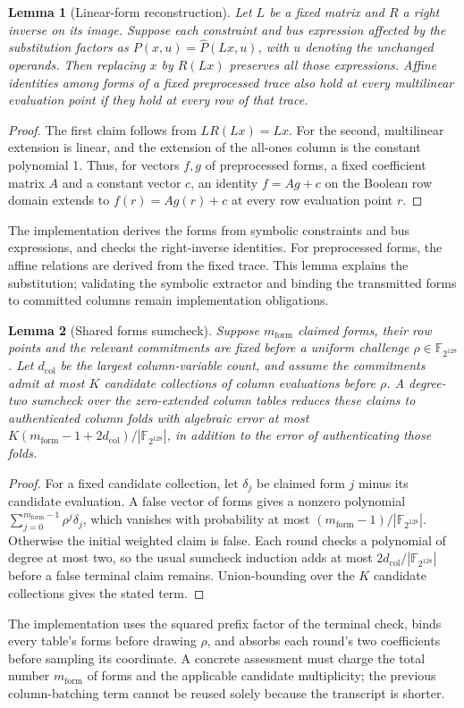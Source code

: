 \documentclass[11pt]{article}
\newtheorem{lemma}{Lemma}
\newcommand{\F}{\mathbb{F}_{2^{128}}}
\begin{document}
\begin{lemma}[Linear-form reconstruction]\label{lem:forms}
Let $L$ be a fixed matrix and $R$ a right inverse on its image. Suppose each
constraint and bus expression affected by the substitution factors as
$P(x,u)=\widehat P(Lx,u)$, with $u$ denoting the unchanged operands. Then
replacing $x$ by $R(Lx)$ preserves all those expressions. Affine identities
among forms of a fixed preprocessed trace also hold at every multilinear
evaluation point if they hold at every row of that trace.
\end{lemma}
\begin{proof}
The first claim follows from $LR(Lx)=Lx$. For the second, multilinear
extension is linear, and the extension of the all-ones column is the
constant polynomial 1. Thus, for vectors $f,g$ of preprocessed forms, a
fixed coefficient matrix $A$ and a constant vector $c$, an identity
$f=Ag+c$ on the Boolean row domain extends to $f(r)=Ag(r)+c$ at every
row evaluation point $r$.
\end{proof}
The implementation derives the forms from symbolic constraints and bus
expressions, and checks the right-inverse identities. For preprocessed
forms, the affine relations are derived from the fixed trace. This lemma
explains the substitution; validating the symbolic extractor and binding
the transmitted forms to committed columns remain implementation obligations.

\begin{lemma}[Shared forms sumcheck]\label{lem:shared_forms}
Suppose $m_{\mathrm{form}}$ claimed forms, their row points and the relevant
commitments are fixed before a uniform challenge $\rho\in\F$. Let
$d_{\mathrm{col}}$ be the largest column-variable count, and assume the
commitments admit at most $K$ candidate collections
of column evaluations before $\rho$. A degree-two sumcheck over the
zero-extended column tables reduces these claims to authenticated column
folds with algebraic error at most
$K(m_{\mathrm{form}}-1+2d_{\mathrm{col}})/|\F|$, in addition to the error of
authenticating those folds.
\end{lemma}
\begin{proof}
For a fixed candidate collection, let $\delta_j$ be claimed form $j$ minus
its candidate evaluation. A false vector of forms gives a nonzero
polynomial $\sum_{j=0}^{m_{\mathrm{form}}-1}\rho^j\delta_j$, which vanishes with probability
at most $(m_{\mathrm{form}}-1)/|\F|$. Otherwise the initial weighted claim is false. Each
round checks a polynomial of degree at most two, so the usual sumcheck
induction adds at most $2d_{\mathrm{col}}/|\F|$ before a false terminal claim remains.
Union-bounding over the $K$ candidate collections gives the stated term.
\end{proof}
The implementation uses the squared prefix factor of the terminal check,
binds every table's forms before drawing $\rho$, and absorbs each round's two
coefficients before sampling its coordinate. A concrete assessment must charge the total number $m_{\mathrm{form}}$ of forms and
the applicable candidate multiplicity; the previous column-batching term
cannot be reused solely because the transcript is shorter.
\end{document}
